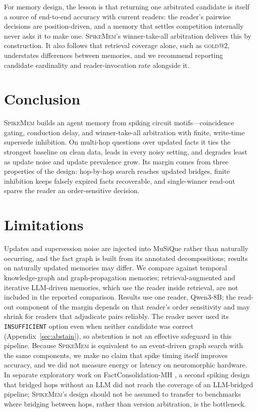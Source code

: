 \documentclass[11pt]{article}
\makeatletter
\newcommand{\goldtwo}{\textsc{gold@}$2$}
\newcommand{\sm}{\textsc{SpikeMem}}
\makeatother
\begin{document}
For memory design, the lesson is that returning one arbitrated candidate is itself a source of
end-to-end accuracy with current readers: the reader's pairwise decisions are position-driven, and a
memory that settles competition internally never asks it to make one. \sm{}'s winner-take-all
arbitration delivers this by construction. It also follows that retrieval coverage alone, such as
\goldtwo{}, understates differences between memories, and we recommend reporting candidate
cardinality and reader-invocation rate alongside it.

\section{Conclusion}

\sm{} builds an agent memory from spiking circuit motifs---coincidence gating, conduction delay, and
winner-take-all arbitration with finite, write-time supersede inhibition. On multi-hop questions over
updated facts it ties the strongest baseline on clean data, leads in every noisy setting, and degrades
least as update noise and update prevalence grow. Its margin comes from three properties of the
design: hop-by-hop search reaches updated bridges, finite inhibition keeps falsely expired facts
recoverable, and single-winner read-out spares the reader an order-sensitive decision.

\section*{Limitations}

Updates and supersession noise are injected into MuSiQue rather than naturally occurring, and the fact
graph is built from its annotated decompositions; results on naturally updated memories may differ.
We compare against temporal knowledge-graph and graph-propagation memories; retrieval-augmented and
iterative LLM-driven memories, which use the reader inside retrieval, are not included in the
reported comparison. Results use one reader, Qwen3-8B; the read-out component of the margin depends
on that reader's order sensitivity and may shrink for readers that adjudicate pairs reliably. The
reader never used its \texttt{INSUFFICIENT} option even when neither candidate was correct
(Appendix~\ref{sec:abstain}), so abstention is not an effective safeguard in this pipeline. Because
\sm{} is equivalent to an event-driven graph search with the same components, we make no claim that
spike timing itself improves accuracy, and we did not measure energy or latency on neuromorphic
hardware. In separate exploratory work on FactConsolidation-MH \citep{hu2026memoryagentbench}, a
second spiking design that bridged hops without an LLM did not reach the coverage of an LLM-bridged
pipeline; \sm{}'s design should not be assumed to transfer to benchmarks where bridging between hops,
rather than version arbitration, is the bottleneck.
\end{document}

